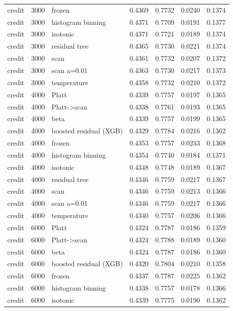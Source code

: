 \begin{tabular}{lllrrrr}
credit & 3000 & frozen & 0.4369 & 0.7732 & 0.0240 & 0.1374 \\
credit & 3000 & histogram binning & 0.4371 & 0.7709 & 0.0191 & 0.1377 \\
credit & 3000 & isotonic & 0.4371 & 0.7721 & 0.0189 & 0.1374 \\
credit & 3000 & residual tree & 0.4365 & 0.7730 & 0.0221 & 0.1374 \\
credit & 3000 & scan & 0.4361 & 0.7732 & 0.0207 & 0.1372 \\
credit & 3000 & scan a=0.01 & 0.4363 & 0.7730 & 0.0217 & 0.1373 \\
credit & 3000 & temperature & 0.4358 & 0.7732 & 0.0210 & 0.1372 \\
credit & 4000 & Platt & 0.4339 & 0.7757 & 0.0197 & 0.1365 \\
credit & 4000 & Platt->scan & 0.4338 & 0.7761 & 0.0193 & 0.1365 \\
credit & 4000 & beta & 0.4339 & 0.7757 & 0.0199 & 0.1365 \\
credit & 4000 & boosted residual (XGB) & 0.4329 & 0.7784 & 0.0216 & 0.1362 \\
credit & 4000 & frozen & 0.4353 & 0.7757 & 0.0233 & 0.1368 \\
credit & 4000 & histogram binning & 0.4354 & 0.7740 & 0.0184 & 0.1371 \\
credit & 4000 & isotonic & 0.4348 & 0.7748 & 0.0189 & 0.1367 \\
credit & 4000 & residual tree & 0.4346 & 0.7759 & 0.0217 & 0.1367 \\
credit & 4000 & scan & 0.4346 & 0.7759 & 0.0213 & 0.1366 \\
credit & 4000 & scan a=0.01 & 0.4346 & 0.7759 & 0.0217 & 0.1366 \\
credit & 4000 & temperature & 0.4340 & 0.7757 & 0.0206 & 0.1366 \\
credit & 6000 & Platt & 0.4324 & 0.7787 & 0.0186 & 0.1359 \\
credit & 6000 & Platt->scan & 0.4324 & 0.7788 & 0.0189 & 0.1360 \\
credit & 6000 & beta & 0.4324 & 0.7787 & 0.0186 & 0.1360 \\
credit & 6000 & boosted residual (XGB) & 0.4320 & 0.7804 & 0.0210 & 0.1358 \\
credit & 6000 & frozen & 0.4337 & 0.7787 & 0.0225 & 0.1362 \\
credit & 6000 & histogram binning & 0.4338 & 0.7757 & 0.0178 & 0.1366 \\
credit & 6000 & isotonic & 0.4339 & 0.7775 & 0.0190 & 0.1362 \\

\end{tabular}
